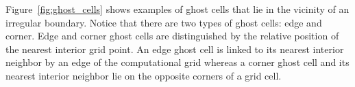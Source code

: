 \documentclass[oneeqnum,onefignum,onetabnum,onethmnum]{siamltex}
\begin{document}
Figure~\ref{fig:ghost_cells} shows examples of ghost cells that lie in the 
vicinity of an irregular boundary.  Notice that there are two types of ghost 
cells:  edge and corner.  Edge and corner ghost cells are distinguished by 
the relative position of the nearest interior grid point.  An edge ghost cell 
is linked to its nearest interior neighbor by an edge of the computational 
grid whereas a corner ghost cell and its nearest interior neighbor lie on the 
opposite corners of a grid cell.

\begin{figure}[tb]
\begin{center}
\ \ \ \ \ \ \ \ \ \ \ \ \ 

\end{center}
\end{figure}
\end{document}
